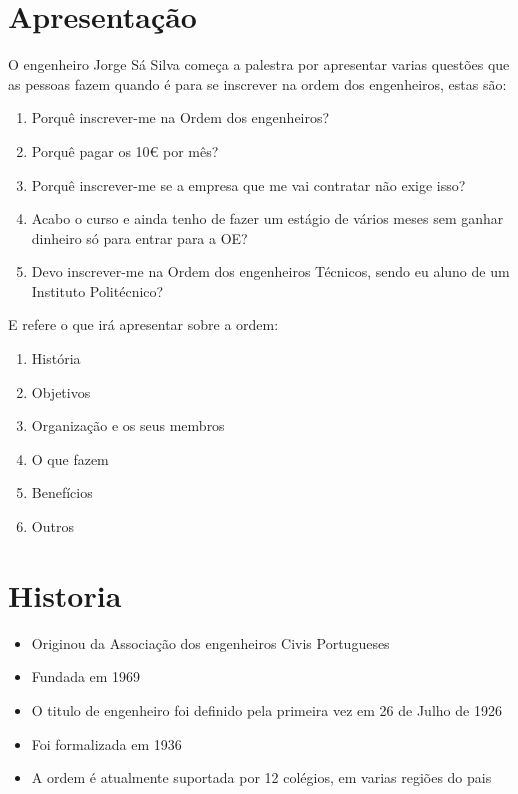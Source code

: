 
\section{Apresentação}
O engenheiro Jorge Sá Silva começa a palestra por apresentar varias questões que as pessoas fazem quando é para se inscrever na ordem dos engenheiros, estas são:

\begin{enumerate}
    \item Porquê inscrever-me na Ordem dos engenheiros?
    \item Porquê pagar os 10€ por mês?
    \item Porquê inscrever-me se a empresa que me vai contratar não exige isso?
    \item Acabo o curso e ainda tenho de fazer um estágio de vários meses sem ganhar dinheiro só para entrar para a OE?
    \item Devo inscrever-me na Ordem dos engenheiros Técnicos, sendo eu aluno de um Instituto Politécnico?
\end{enumerate}

E refere o que irá apresentar sobre a ordem:

\begin{enumerate}
    \item História
    \item Objetivos
    \item Organização e os seus membros
    \item O que fazem
    \item Benefícios
    \item Outros
\end{enumerate}

\newpage
\section{Historia}
\begin{itemize}
    \item Originou da Associação dos engenheiros Civis Portugueses
    \item Fundada em 1969
    \item O titulo de engenheiro foi definido pela primeira vez em 26 de Julho de 1926
    \item Foi formalizada em 1936
    \item A ordem é atualmente suportada por 12 colégios, em varias regiões do pais
\end{itemize}

